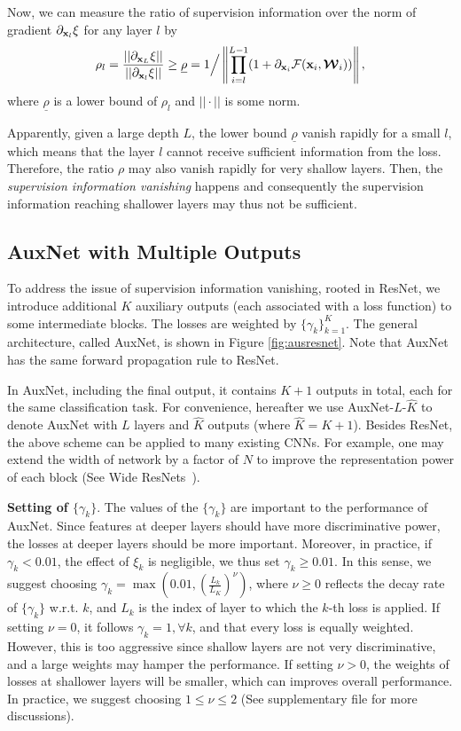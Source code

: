 \documentclass[10pt,onecolumn,letterpaper]{article}
\def\mF{{\mathcal F}}
\def\bmW{\mbox{\boldmath${\mathcal W}$}}
\def\bx{{\bf x}}
\def\SexyName{AuxNet\xspace}
\begin{document}
Now, we can measure the ratio of supervision information over the norm of gradient ${{\partial_{\bx_l} \xi }}$   for any layer $l$ by
$$
\rho_l = \frac{||\partial_{\bx_{L}} \xi||}{||\partial_{\bx_{l}} \xi||} \geq \underline{\rho} =  1 \Big/ \left\|\prod_{i = l}^{L - 1}( {1 + \partial_{\bx_i}  {\mF({\bx_i},{{\bmW}_i})}} )\right\|,
$$
where $\underline{\rho}$ is a lower bound of $\rho_l$ and $||\cdot||$ is some norm.

Apparently, given a large depth $L$, the lower bound $\underline{\rho}$ vanish rapidly for a small $l$, which means that the layer $l$ cannot receive sufficient information from the loss. Therefore, the ratio $\rho$ may also vanish rapidly for very shallow layers. Then, the \emph{{supervision information vanishing}} happens and consequently the supervision information reaching shallower layers may thus not be sufficient.










\subsection{\SexyName with Multiple Outputs}
To address the issue of supervision information vanishing, rooted in ResNet, we introduce additional $K$ auxiliary outputs (each associated with a loss function) to some intermediate blocks. The losses are weighted by $\{\gamma_k\}_{k=1}^K$. The general architecture, called \SexyName, is shown in Figure \ref{fig:ausresnet}. Note that \SexyName has the same forward propagation rule to ResNet.


In \SexyName, including the final output, it contains $K+1$ outputs in total, each for the same classification task. For convenience, hereafter we use \SexyName-$L$-$\widehat{K}$ to denote \SexyName with $L$ layers and $\widehat{K}$ outputs (where $\widehat{K} = K+1$). Besides ResNet, the above scheme can be applied to many existing CNNs. For example, one may extend the width of network by a factor of $N$ to improve the representation power of each block (See Wide ResNets~\cite{zagoruyko2016wide}).



\textbf{{Setting of $\{\gamma_k\}$}}.
The values of the $\{\gamma_k\}$ are  important to the performance of \SexyName.  Since features at deeper layers should have more discriminative power, the losses at deeper layers should be more important. Moreover, in practice, if $\gamma_k<0.01$, the effect of $\xi_k$ is negligible, we thus set $\gamma_k \geq 0.01$. In this sense, we suggest choosing $\gamma_k = \max(0.01, (\frac{L_k}{L_K})^\nu)$, where $\nu\geq 0$ reflects the decay rate of $\{\gamma_k\}$ w.r.t. $k$, and $L_k$ is the index of layer to which the $k$-th loss is applied. If setting $\nu = 0$, it follows $\gamma_k = 1, \forall k$, and that every loss is equally weighted.  However, this is too aggressive since shallow layers are not very discriminative, and a large weights may hamper the performance. If setting $\nu > 0$, the weights of losses at shallower layers will be smaller, which can improves overall performance. In practice, we suggest choosing $1\leq \nu \leq 2$ (See supplementary file for more discussions).
\end{document}

